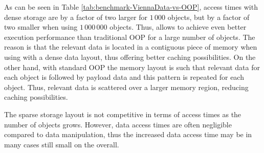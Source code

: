 As can be seen in Table \ref{tab:benchmark-ViennaData-vs-OOP}, access times with dense storage are by a factor of two larger for $1\,000$ objects, but by a factor of two smaller when using $1\,000\,000$ objects.
Thus, {\ViennaData} allows to achieve even better execution performance than traditional OOP for a large number of objects. The reason is that the relevant data is located in a contiguous piece of memory when using {\ViennaData} with a dense data layout, thus offering better caching possibilities. On the other hand, with standard OOP the memory layout is such that relevant data for each object is followed by payload data and this pattern is repeated for each object. Thus, relevant data is scattered over a larger memory region, reducing caching possibilities.

The sparse storage layout is not competitive in terms of access times as the number of objects grows. However, data access times are often negligible compared to data manipulation, thus
the increased data access time may be in many cases still small on the overall.